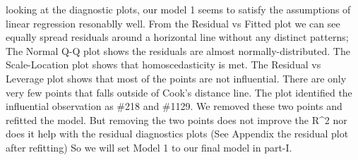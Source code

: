 \documentclass[]{article}
\begin{document}
looking at the diagnostic plots, our model 1 seems to satisfy the
assumptions of linear regression resonablly well. From the Residual vs
Fitted plot we can see equally spread residuals around a horizontal line
without any distinct patterns; The Normal Q-Q plot shows the residuals
are almost normally-distributed. The Scale-Location plot shows that
homoscedasticity is met. The Residual vs Leverage plot shows that most
of the points are not influential. There are only very few points that
falls outside of Cook's distance line. The plot identified the
influential observation as \#218 and \#1129. We removed these two points
and refitted the model. But removing the two points does not improve the
R\^{}2 nor does it help with the residual diagnostics plots (See
Appendix the residual plot after refitting) So we will set Model 1 to
our final model in part-I.
\end{document}

